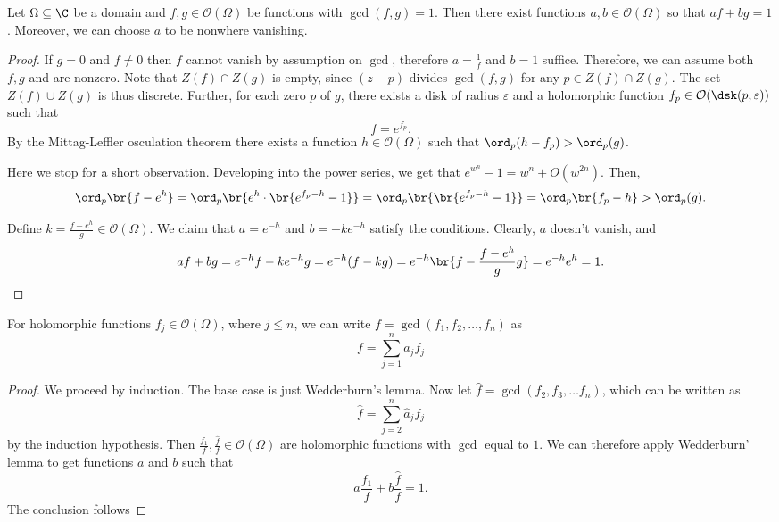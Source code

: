 
\begin{lema}[Wedderburn]
Let $\Omega \subseteq \C$ be a domain and
$f, g \in \mathcal{O}(\Omega)$ be functions with $\gcd(f, g) = 1$.
Then there exist functions $a, b \in \mathcal{O}(\Omega)$ so that
$a f + b g = 1$. Moreover, we can choose $a$ to be nonwhere
vanishing. 
\end{lema}

\begin{proof}
If $g = 0$ and $f \neq 0$ then $f$ cannot vanish by assumption on
$\gcd$, therefore $a = \frac{1}{f}$ and $b = 1$ suffice. Therefore,
we can assume both $f, g$ and are nonzero. Note that
$Z(f) \cap Z(g)$ is empty, since $(z - p)$ divides $\gcd(f, g)$ for
any $p \in Z(f) \cap Z(g)$. The set $Z(f) \cup Z(g)$ is thus
discrete. Further, for each zero $p$ of $g$, there exists a disk of
radius $\varepsilon$ and a holomorphic function
$f_p \in \mathcal{O}(\dsk(p, \varepsilon))$ such that
\[
f = e^{f_p}.
\]
By the Mittag-Leffler osculation theorem there exists a function
$h \in \mathcal{O}(\Omega)$ such that
$\ord_p(h - f_p) > \ord_p(g)$.

Here we stop for a short observation. Developing into the power
series, we get that $e^{w^n} - 1 = w^n + O(w^{2 n})$. Then, 
\[
\ord_p \br{f - e^h} =
\ord_p \br{e^h \cdot \br{e^{f_p - h} - 1}} =
\ord_p \br{\br{e^{f_p - h} - 1}} =
\ord_p \br{f_p - h} >
\ord_p(g).
\]

Define $k = \frac{f - e^h}{g} \in \mathcal{O}(\Omega)$. We claim
that $a = e^{-h}$ and $b = -k e^{-h}$ satisfy the conditions.
Clearly, $a$ doesn't vanish, and
\[
a f + b g =
e^{-h} f - k e ^{-h} g =
e^{-h}(f - k g) =
e^{- h} \br{f - \frac{f - e^h}{g} g} =
e^{-h} e^h =
1. \qedhere
\]
\end{proof}

\begin{posledica}
For holomorphic functions $f_j \in \mathcal{O}(\Omega)$, where
$j \leq n$, we can write $f = \gcd(f_1, f_2, \dots, f_n)$ as 
\[
f = \sum_{j=1}^n a_j f_j
\]
\end{posledica}

\begin{proof}
We proceed by induction. The base case is just Wedderburn's lemma.
Now let $\hat{f} = \gcd(f_2, f_3, \dots f_n)$, which can be
written as
\[
\hat{f} = \sum_{j=2}^n \hat{a}_j f_j
\]
by the induction hypothesis. Then
$\frac{f_1}{f}, \frac{\hat{f}}{f} \in \mathcal{O}(\Omega)$ are
holomorphic functions with $\gcd$ equal to $1$. We can therefore
apply Wedderburn' lemma to get functions $a$ and $b$ such that
\[
a \frac{f_1}{f} + b \frac{\hat{f}}{f} = 1.
\]
The conclusion follows
\end{proof}

